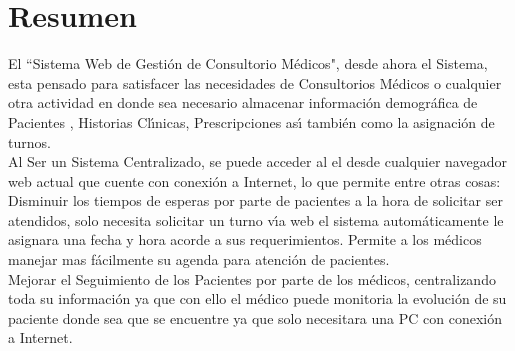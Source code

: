 \section{Resumen}

El ``Sistema Web de Gesti\'on de Consultorio M\'edicos", desde ahora el Sistema, esta pensado
para satisfacer las necesidades de Consultorios M\'edicos o cualquier otra actividad en donde
sea necesario almacenar informaci\'on demogr\'afica de Pacientes , Historias Cl\'{\i}nicas, 
Prescripciones as\'{\i} tambi\'en como la asignaci\'on de turnos.\\[0.1cm] 

Al Ser un Sistema Centralizado, se puede acceder al el desde cualquier navegador web actual 
que cuente con conexi\'on a Internet, lo que permite entre otras cosas:\\[0.1cm]

Disminuir los tiempos de esperas por parte de pacientes a la hora de solicitar ser atendidos, 
solo necesita solicitar un turno v\'{\i}a web el sistema autom\'aticamente le asignara una 
fecha y hora acorde a sus requerimientos. Permite a los m\'edicos manejar mas f\'acilmente su
agenda para atenci\'on de pacientes.\\[0.1cm]

Mejorar el Seguimiento de los Pacientes por parte de los m\'edicos, centralizando toda su 
informaci\'on ya que con ello el m\'edico puede monitoria la evoluci\'on de su paciente donde 
sea que se encuentre ya que solo necesitara una PC con conexi\'on a Internet.\\[0.1cm]








